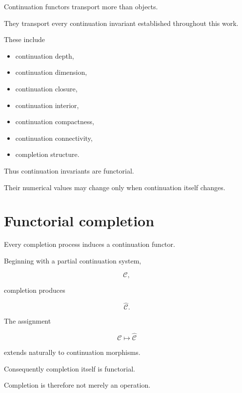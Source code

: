 \documentclass[13pt,openany]{book}
\theoremstyle{plain}
\theoremstyle{definition}
\begin{document}
Continuation functors transport more than objects.

They transport every continuation invariant established throughout this work.

These include

\begin{itemize}

\item continuation depth,

\item continuation dimension,

\item continuation closure,

\item continuation interior,

\item continuation compactness,

\item continuation connectivity,

\item completion structure.

\end{itemize}

Thus continuation invariants are functorial.

Their numerical values may change only when continuation itself changes.

\section{Functorial completion}

Every completion process induces a continuation functor.

Beginning with a partial continuation system,

\[
\mathcal C,
\]

completion produces

\[
\widehat{\mathcal C}.
\]

The assignment

\[
\mathcal C
\longmapsto
\widehat{\mathcal C}
\]

extends naturally to continuation morphisms.

Consequently completion itself is functorial.

Completion is therefore not merely an operation.
\end{document}
